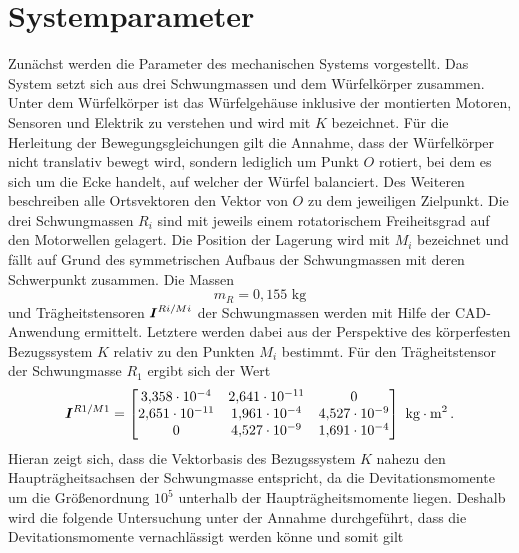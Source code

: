 \section{Systemparameter}\label{TM_3D_Systemparameter}
Zunächst werden die Parameter des mechanischen Systems vorgestellt. Das System setzt sich aus drei Schwungmassen und dem Würfelkörper zusammen. Unter dem Würfelkörper ist das Würfelgehäuse inklusive der montierten Motoren, Sensoren und Elektrik zu verstehen und wird mit $K$ bezeichnet. Für die Herleitung der Bewegungsgleichungen gilt die Annahme, dass der Würfelkörper nicht translativ bewegt wird, sondern lediglich um Punkt $O$ rotiert, bei dem es sich um die Ecke handelt, auf welcher der Würfel balanciert. Des Weiteren beschreiben alle Ortsvektoren den Vektor von $O$ zu dem jeweiligen Zielpunkt. Die drei Schwungmassen $R_i$ sind mit jeweils einem rotatorischem Freiheitsgrad auf den Motorwellen gelagert. Die Position der Lagerung wird mit $M_i$ bezeichnet und fällt auf Grund des symmetrischen Aufbaus der Schwungmassen mit deren Schwerpunkt zusammen.
Die Massen
\begin{equation}
m_R = 0{,}155\text{ kg}
\end{equation}
und Trägheitstensoren $\boldsymbol{I}^{Ri/Mi}$ der Schwungmassen werden mit Hilfe der CAD-Anwendung ermittelt. 
Letztere werden dabei aus der Perspektive des körperfesten Bezugssystem $K$ relativ zu den Punkten $M_i$ bestimmt. Für den Trägheitstensor der Schwungmasse $R_1$ ergibt sich der Wert
\begin{equation}
 \boldsymbol{I}^{R1/M1} = \begin{bmatrix}
3{,}358\cdot 10^{-4} & 2{,}641\cdot 10^{-11} & 0 
\\
2{,}651\cdot 10^{-11} & 1{,}961\cdot 10^{-4} & 4{,}527\cdot 10^{-9} 
\\
0 & 4{,}527\cdot 10^{-9} & 1{,}691\cdot 10^{-4}
\end{bmatrix} \text{ kg}\cdot \text{m}^2 \,.
\end{equation}
Hieran zeigt sich, dass die Vektorbasis des Bezugssystem $K$ nahezu den Haupträgheitsachsen der Schwungmasse entspricht, da die Devitationsmomente um die Größenordnung $10^{5}$ unterhalb der Haupträgheitsmomente liegen. Deshalb wird die folgende Untersuchung unter der Annahme durchgeführt, dass die Devitationsmomente vernachlässigt werden könne und somit gilt
